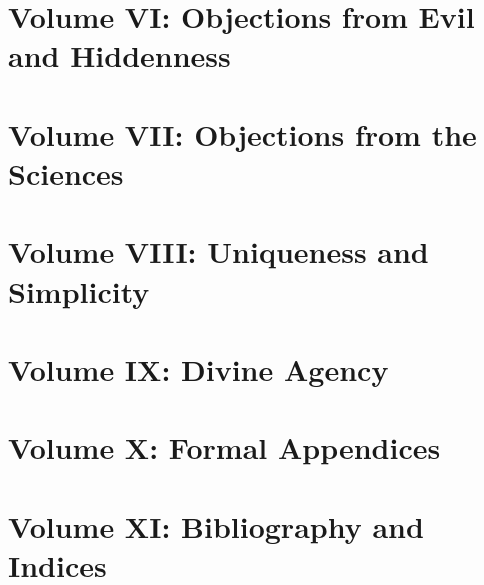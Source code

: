 \documentclass{situationist-preprint}
\begin{document}
\section{Volume VI: Objections from Evil and Hiddenness}\label{s:vol6}


\section{Volume VII: Objections from the Sciences}\label{s:vol7}


\section{Volume VIII: Uniqueness and Simplicity}\label{s:vol8}


\section{Volume IX: Divine Agency}\label{s:vol9}


\section{Volume X: Formal Appendices}\label{s:vol10}


\section{Volume XI: Bibliography and Indices}\label{s:vol11}

\end{document}

